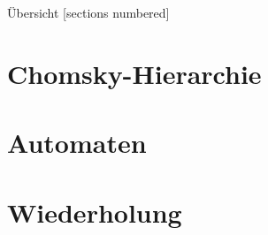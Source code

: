 %
%
%
%



\renewcommand\daynr{4}




\maketitle

\begin{frame}[fragile]{Übersicht}
  [sections numbered]
  \tableofcontents%
\end{frame}

\section{Chomsky-Hierarchie}




\section{Automaten}








\section{Wiederholung}

